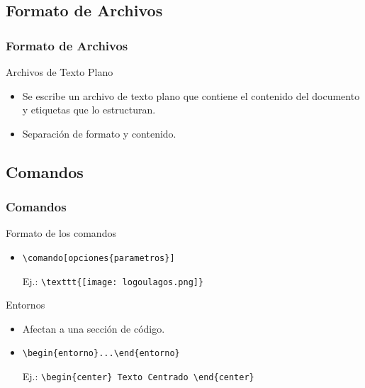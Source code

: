 \documentclass[aspectratio=43]{beamer}%
\begin{document}
\subsection{Formato de Archivos}

\begin{frame}[fragile]
\frametitle{\textbf{Formato de Archivos}}
\justifying
 \begin{exampleblock}{Archivos de Texto Plano}
\begin{itemize}\justifying
  \item Se escribe un archivo de texto plano que contiene el contenido del documento y etiquetas que lo estructuran.
  \item Separación de formato y contenido.
\end{itemize}

\end{exampleblock}

\end{frame}
\subsection{Comandos}
\begin{frame}[fragile]
\frametitle{\textbf{Comandos}}
\justifying
 \begin{exampleblock}{Formato de los comandos}
\begin{itemize}\justifying
  \item \verb+\comando[opciones{parametros}]+
  \item [Ej.:] \verb+\texttt{[image: logoulagos.png]}+
\end{itemize}

\end{exampleblock}

\begin{exampleblock}{Entornos}
\begin{itemize}\justifying
  \item Afectan a una sección de código.
  \item \verb+\begin{entorno}...\end{entorno}+
  \item [Ej.:] \verb+\begin{center} Texto Centrado \end{center}+
\end{itemize}

\end{exampleblock}


\end{frame}
\end{document}
